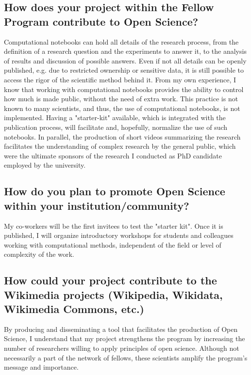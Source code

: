 \documentclass[11pt,]{article}
\begin{document}
\subsection*{How does your project within the Fellow Program contribute to Open Science?}
Computational notebooks can hold all details of the research process, from the definition of a research question and the experiments to answer it, to the analysis of results and discussion of possible answers.
Even if not all details can be openly published, e.g. due to restricted ownership or sensitive data, it is still possible to access the rigor of the scientific method behind it.
From my own experience, I know that working with computational notebooks provides the ability to control how much is made public, without the need of extra work.
This practice is not known to many scientists, and thus, the use of computational notebooks, is not implemented. Having a "starter-kit" available, which is integrated with the publication process, will facilitate and, hopefully, normalize the use of such notebooks.
In parallel, the production of short videos summarizing the research facilitates the understanding of complex research by the general public, which were the ultimate sponsors of the research I conducted as PhD candidate employed by the university.

\subsection*{How do you plan to promote Open Science within your institution/community?}
My co-workers will be the first invitees to test the "starter kit".
Once it is published, I will organize introductory workshops for students and colleagues working with computational methods, independent of the field or level of complexity of the work.

\subsection*{How could your project contribute to the Wikimedia projects (Wikipedia, Wikidata, Wikimedia Commons, etc.)}
By producing and disseminating a tool that facilitates the production of Open Science, I understand that my project strengthens the program by increasing the number of researchers willing to apply principles of open science.
Although not necessarily a part of the network of fellows, these scientists amplify the program’s message and importance.
\end{document}
